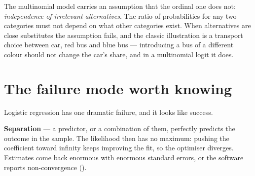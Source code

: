 \documentclass[
  letterpaper,
  10pt,
  twoside,
  openright,
  numbers=noenddot,
  chapterprefix=true]{scrbook}
\begin{document}
The multinomial model carries an assumption that the ordinal one does
not: \emph{independence of irrelevant alternatives}. The ratio of
probabilities for any two categories must not depend on what other
categories exist. When alternatives are close substitutes the assumption
fails, and the classic illustration is a transport choice between car,
red bus and blue bus --- introducing a bus of a different colour should
not change the car's share, and in a multinomial logit it does.

\section{The failure mode worth
knowing}\label{the-failure-mode-worth-knowing}

Logistic regression has one dramatic failure, and it looks like success.

\begin{qmibdefinition}

{\textbf{Separation}} --- a predictor, or a combination of them,
perfectly predicts the outcome in the sample. The likelihood then has no
maximum: pushing the coefficient toward infinity keeps improving the
fit, so the optimiser diverges. Estimates come back enormous with
enormous standard errors, or the software reports non-convergence
().

\end{qmibdefinition}
\end{document}
